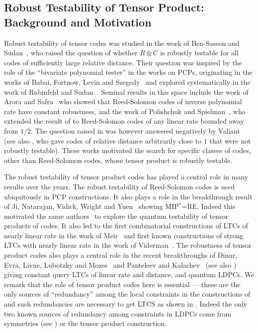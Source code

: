 \documentclass[11pt]{article}
\begin{document}
\subsection{Robust Testability of Tensor Product: Background and Motivation}

Robust testability of tensor codes was studied in the work of Ben-Sasson and Sudan~\cite{BSS-tensor}, who raised the question of whether $R \otimes C$ is robustly testable for all codes of sufficiently large relative distance. Their question was inspired by the role of the ``bivariate polynomial tester'' in the works on PCPs, originating in the works of Babai, Fortnow, Levin and Szegedy~\cite{BFLS} and explored systematically in the work of Rubinfeld and Sudan~\cite{RubinfeldS}. Seminal results in this space include the work of Arora and Safra~\cite{AroSaf} who showed that Reed-Solomon codes of inverse polynomial rate have constant robustness, and the work of Polishchuk and Spielman~\cite{PolSpi}, who extended the result of \cite{AroSaf} to Reed-Solomon codes of any linear rate bounded away from $1/2$. The question raised in \cite{BSS-tensor} was however answered negatively by Valiant~\cite{valiant} (see also \cite{CopRud,GolMei}, who gave codes of relative distance arbitrarily close to $1$ that were not robustly testable). These works motivated the search for specific classes of codes, other than Reed-Solomon codes, whose tensor product is robustly testable.


The robust testability of tensor product codes has played a central role in many results over the years. The robust testability of Reed-Solomon codes is used ubiquitously in PCP constructions. It also plays a role in the breakthrough result of Ji, Natarajan, Vidick, Wright and Yuen~\cite{MIPRE} showing MIP$^*$=RE. Indeed this motivated the same authors~\cite{quantum-tensor}  to explore the quantum testability of tensor products of codes. It also led to the first combinatorial constructions of LTCs of nearly linear rate in the work of Meir~\cite{Meir} and first known constructions of strong LTCs with nearly linear rate in the work of Viderman~\cite{Viderman}. The robustness of tensor product codes also plays a central role in the recent breakthroughs of Dinur, Evra, Livne, Lubotzky and Mozes~\cite{DELLM} and Panteleev and Kalachev~\cite{PanKal} (see also \cite{LevZem}) giving constant query LTCs of linear rate and distance, and quantum LDPCs. We remark that the role of tensor product codes here is essential --- these are the only sources of ``redundancy'' among the local constraints in the constructions of \cite{DELLM,PanKal,LevZem} and such redundancies are necessary to get LTCS as shown in \cite{BGKSV}. Indeed the only two known sources of redundancy among constraints in LDPCs come from symmetries (see \cite{KauSud}) or the tensor product construction. 
\end{document}
